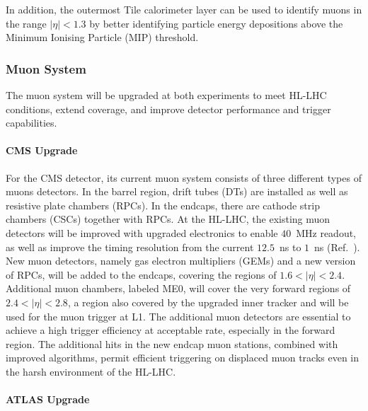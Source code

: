 In addition, the outermost Tile calorimeter layer can be used to identify muons in
the range $|\eta| < 1.3$ by better identifying particle energy depositions above the Minimum
Ionising Particle (MIP) threshold.


\subsubsection{Muon System} \label{sec:upgrademuon}

The muon system will be upgraded at both experiments to meet HL-LHC conditions, extend coverage, and improve detector performance and trigger capabilities. 

\paragraph{CMS Upgrade} 
For the CMS detector, its current muon system consists of three different types of muons detectors. In the barrel region, drift tubes (DTs) are installed as well as resistive plate chambers (RPCs). In the endcaps, there are cathode strip chambers (CSCs) together with RPCs. 
At the HL-LHC, the existing muon detectors will be improved with upgraded electronics to enable $40$~MHz readout, as well as improve the timing resolution from the current $12.5$~ns to $1$~ns (Ref.~\cite{Lourenco:2283189}). 
New muon detectors, namely gas electron multipliers (GEMs) and a new version of RPCs, will be added to the endcaps, covering the regions of $1.6<|\eta|<2.4$. 
Additional muon chambers, labeled ME0, will cover the very forward regions of $2.4<|\eta|<2.8$, a region also covered by the upgraded inner tracker and will be used for the muon trigger at L1. 
The additional muon detectors are essential to achieve a high trigger efficiency at acceptable rate, especially in the forward region.
The additional hits in the new endcap muon stations, combined with improved algorithms, permit efficient triggering on displaced muon tracks even in the harsh environment of the HL-LHC. 

\paragraph{ATLAS Upgrade}


